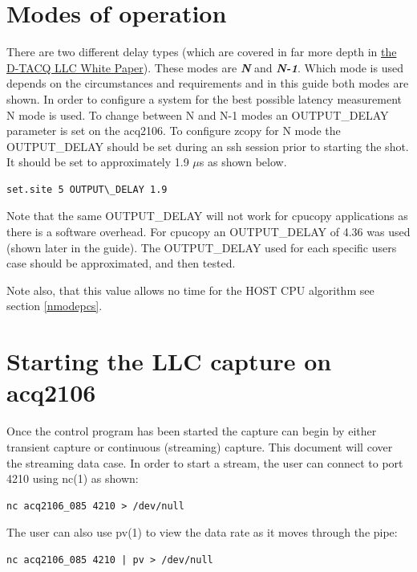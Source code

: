 \documentclass{article}
\begin{document}
\section{Modes of operation} \label{modes}

There are two different delay types (which are covered in far more depth in \href{http://www.d-tacq.com/resources/LLC_White_Paper.pdf}{the D-TACQ LLC White Paper}).
These modes are \textit{\textbf{N}} and \textit{\textbf{N-1}}.
Which mode is used depends on the circumstances and requirements and in this guide both modes are shown.
In order to configure a system for the best possible latency measurement N mode is used. To change between N and N-1 modes an OUTPUT\_DELAY parameter is set on the acq2106.
To configure zcopy for N mode the OUTPUT\_DELAY should be set during an ssh session prior to starting the shot.
It should be set to approximately 1.9 $\mu$s as shown below.

\begin{verbatim}
set.site 5 OUTPUT\_DELAY 1.9
\end{verbatim}

Note that the same OUTPUT\_DELAY will not work for cpucopy applications as there is a software overhead.
For cpucopy an OUTPUT\_DELAY of 4.36 was used (shown later in the guide).
The OUTPUT\_DELAY used for each specific users case should be approximated, and then tested.

Note also, that this value allows no time for the HOST CPU algorithm see section \ref{nmodepcs}.

\section{Starting the LLC capture on acq2106} \label{startingcap}
Once the control program has been started the capture can begin by either transient capture or continuous (streaming) capture.
This document will cover the streaming data case.
In order to start a stream, the user can connect to port 4210 using nc(1) as shown:

\begin{verbatim}
nc acq2106_085 4210 > /dev/null
\end{verbatim}

The user can also use pv(1) to view the data rate as it moves through the pipe:

\begin{verbatim}
nc acq2106_085 4210 | pv > /dev/null
\end{verbatim}
\end{document}
